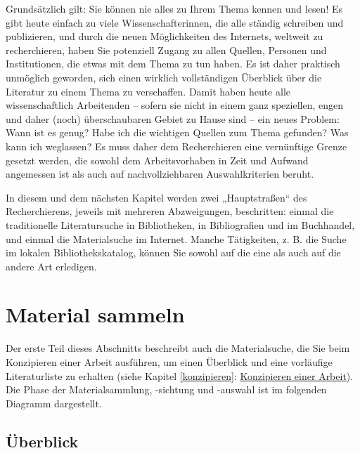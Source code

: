 \documentclass[]{book}
\theoremstyle{definition}
\theoremstyle{definition}
\theoremstyle{definition}
\theoremstyle{remark}
\begin{document}
Grundsätzlich gilt: Sie können nie alles zu Ihrem Thema kennen und
lesen! Es gibt heute einfach zu viele Wissenschafterinnen, die alle
ständig schreiben und publizieren, und durch die neuen Möglichkeiten des
Internets, weltweit zu recherchieren, haben Sie potenziell Zugang zu
allen Quellen, Personen und Institutionen, die etwas mit dem Thema zu
tun haben. Es ist daher praktisch unmöglich geworden, sich einen
wirklich vollständigen Überblick über die Literatur zu einem Thema zu
verschaffen. Damit haben heute alle wissenschaftlich Arbeitenden --
sofern sie nicht in einem ganz speziellen, engen und daher (noch)
überschaubaren Gebiet zu Hause sind -- ein neues Problem: Wann ist es
genug? Habe ich die wichtigen Quellen zum Thema gefunden? Was kann ich
weglassen? Es muss daher dem Recherchieren eine vernünftige Grenze
gesetzt werden, die sowohl dem Arbeitsvorhaben in Zeit und Aufwand
angemessen ist als auch auf nachvollziehbaren Auswahlkriterien beruht.

In diesem und dem nächsten Kapitel werden zwei „Hauptstraßen`` des
Recherchierens, jeweils mit mehreren Abzweigungen, beschritten: einmal
die traditionelle Literatursuche in Bibliotheken, in Bibliografien und
im Buchhandel, und einmal die Materialsuche im Internet. Manche
Tätigkeiten, z. B. die Suche im lokalen Bibliothekskatalog, können Sie
sowohl auf die eine als auch auf die andere Art erledigen.

\section{Material sammeln}\label{recherchieren-material-sammeln}

Der erste Teil dieses Abschnitts beschreibt auch die Materialsuche, die
Sie beim Konzipieren einer Arbeit ausführen, um einen Überblick und eine
vorläufige Literaturliste zu erhalten (siehe Kapitel \ref{konzipieren}:
\protect\hyperlink{konzipieren}{Konzipieren einer Arbeit}). Die Phase
der Materialsammlung, -sichtung und -auswahl ist im folgenden Diagramm
dargestellt.

\subsection{Überblick}\label{uberblick}
\end{document}
